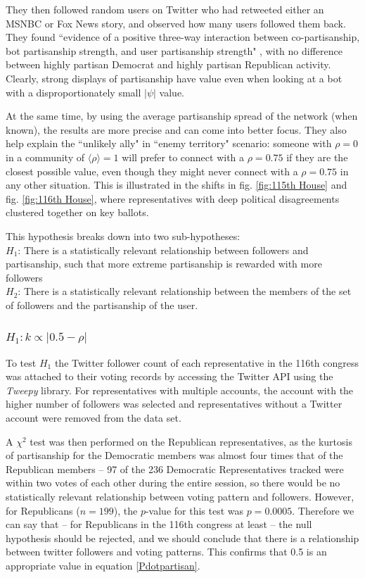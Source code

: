 \documentclass[preprint,review,12pt]{elsarticle}
\begin{document}
They then followed random users on Twitter who had retweeted either an MSNBC or Fox News story, and observed how many users followed them back. They found ``evidence of a positive three-way interaction between co-partisanship, bot partisanship strength, and user partisanship strength" \cite{mosleh2020shared}, with no difference between highly partisan Democrat and highly partisan Republican activity. Clearly, strong displays of partisanship have value even when looking at a bot with a disproportionately small $|\psi|$ value.

At the same time, by using the average partisanship spread of the network (when known), the results are more precise and can come into better focus. They also help explain the ``unlikely ally" in ``enemy territory" scenario: someone with $\rho = 0$ in a community of $\langle \rho \rangle=1$ will prefer to connect with a $\rho = 0.75$ if they are the closest possible value, even though they might never connect with a $\rho = 0.75$ in any other situation. This is illustrated in the shifts in fig. \ref{fig:115th House} and fig. \ref{fig:116th House}, where representatives with deep political disagreements clustered together on key ballots.

This hypothesis breaks down into two sub-hypotheses: \\
\textbf{$H_1$}: There is a statistically relevant relationship between followers and partisanship, such that more extreme partisanship is rewarded with more followers \\
\textbf{$H_2$}: There is a statistically relevant relationship between the members of the set of followers and the partisanship of the user.

 \subsubsection{$H_1: k \propto |0.5 - \rho|$}
  \label{$H_1: k \propto |0.5 - \rho|$}
 To test $H_1$ the Twitter follower count of each representative in the 116th congress was attached to their voting records by accessing the Twitter API using the \textit{Tweepy} library. For representatives with multiple accounts, the account with the higher number of followers was selected and representatives without a Twitter account were removed from the data set. 

A $\chi^2$ test was then performed on the Republican representatives, as the kurtosis of partisanship for the Democratic members was almost four times that of the Republican members -- 97 of the 236 Democratic Representatives tracked were within two votes of each other during the entire session, so there would be no statistically relevant relationship between voting pattern and followers. However, for Republicans ($n = 199$), the $p$-value for this test was $p=0.0005$. Therefore we can say that -- for Republicans in the 116th congress at least -- the null hypothesis should be rejected, and we should conclude that there is a relationship between twitter followers and voting patterns. This confirms that 0.5 is an appropriate value in equation \ref{Pdotpartisan}.
\end{document}
